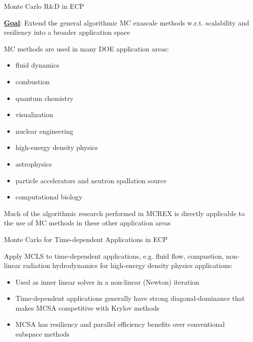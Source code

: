 \documentclass{beamer}
\begin{document}
\begin{frame}{Monte Carlo R\&D in ECP}

  \underline{\bf Goal}: Extend the general algorithmic MC exascale methods
  w.r.t. scalability and resiliency into a broader application space

  \vfill

  MC methods are used in many DOE application areas:
  \begin{itemize}
    \setlength{\itemsep}{-0.2\baselineskip}
  \item fluid dynamics
  \item combustion
  \item quantum chemistry
  \item visualization
  \item nuclear engineering
  \item high-energy density physics
  \item astrophysics
  \item particle accelerators and neutron spallation source
  \item computational biology
  \end{itemize}

  Much of the algorithmic research performed in MCREX is directly applicable
  to the use of MC methods in these other application areas

\end{frame}


\begin{frame}{Monte Carlo for Time-dependent Applications in ECP}

  Apply MCLS to time-dependent applications, e.g. fluid flow, compustion,
  non-linear radiation hydrodynamics for high-energy density physics
  applications:
  \vfill
  \begin{itemize}
  \item Used as inner linear solver in a non-linear (Newton) iteration
  \vfill
  \item Time-dependent applications generally have strong diagonal-dominance
    that makes MCSA competitive with Krylov methods
  \vfill
  \item MCSA has resiliency and parallel efficiency benefits over conventional
    subspace methods
  \end{itemize}

\end{frame}
\end{document}
